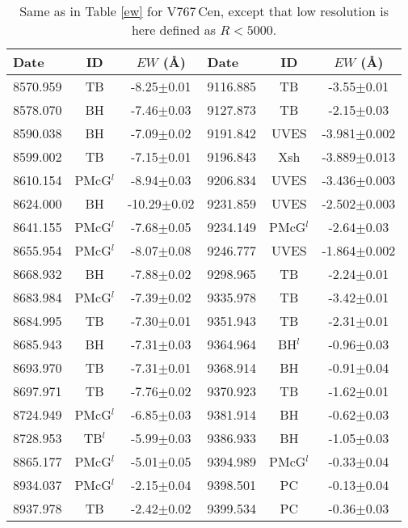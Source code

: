 \documentclass[a4paper,fleqn,usenatbib]{mnras}
\newcommand{\vc}{V767\,Cen}
\begin{document}
\begin{table}
  \caption{Same as in Table \ref{ew} for \vc, except that low resolution is here defined as $R<5000$.  \label{ew2}}
\setlength{\tabcolsep}{3.3pt}
  \begin{tabular}{lcc|lcc}
    \hline
Date & ID & $EW$ (\AA) & Date & ID & $EW$ (\AA)\\
        \hline
8570.959 & TB     & -8.25$\pm$0.01   & 9116.885 & TB     & -3.55$\pm$0.01   \\
8578.070 & BH     & -7.46$\pm$0.03   & 9127.873 & TB     & -2.15$\pm$0.03   \\ 
8590.038 & BH     & -7.09$\pm$0.02   & 9191.842 & UVES   & -3.981$\pm$0.002 \\ 
8599.002 & TB     & -7.15$\pm$0.01   & 9196.843 & Xsh    & -3.889$\pm$0.013 \\ 
8610.154 &PMcG$^l$& -8.94$\pm$0.03   & 9206.834 & UVES   & -3.436$\pm$0.003 \\ 
8624.000 & BH     & -10.29$\pm$0.02  & 9231.859 & UVES   & -2.502$\pm$0.003 \\ 
8641.155 &PMcG$^l$& -7.68$\pm$0.05   & 9234.149 &PMcG$^l$& -2.64$\pm$0.03   \\ 
8655.954 &PMcG$^l$& -8.07$\pm$0.08   & 9246.777 & UVES   & -1.864$\pm$0.002 \\ 
8668.932 & BH     & -7.88$\pm$0.02   & 9298.965 & TB     & -2.24$\pm$0.01   \\ 
8683.984 &PMcG$^l$& -7.39$\pm$0.02   & 9335.978 & TB     & -3.42$\pm$0.01   \\ 
8684.995 & TB     & -7.30$\pm$0.01   & 9351.943 & TB     & -2.31$\pm$0.01   \\ 
8685.943 & BH     & -7.31$\pm$0.03   & 9364.964 & BH$^l$ & -0.96$\pm$0.03   \\ 
8693.970 & TB     & -7.31$\pm$0.01   & 9368.914 & BH     & -0.91$\pm$0.04   \\ 
8697.971 & TB     & -7.76$\pm$0.02   & 9370.923 & TB     & -1.62$\pm$0.01   \\ 
8724.949 &PMcG$^l$& -6.85$\pm$0.03   & 9381.914 & BH     & -0.62$\pm$0.03   \\ 
8728.953 & TB$^l$ & -5.99$\pm$0.03   & 9386.933 & BH     & -1.05$\pm$0.03   \\ 
8865.177 &PMcG$^l$& -5.01$\pm$0.05   & 9394.989 &PMcG$^l$& -0.33$\pm$0.04   \\ 
8934.037 &PMcG$^l$& -2.15$\pm$0.04   & 9398.501 & PC     & -0.13$\pm$0.04   \\ 
8937.978 & TB     & -2.42$\pm$0.02   & 9399.534 & PC     & -0.36$\pm$0.03   \\ 

\end{tabular}
\end{table}
\end{document}
